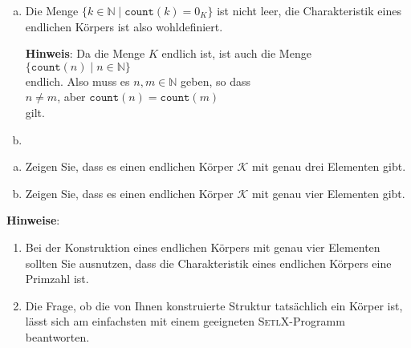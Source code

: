 \begin{enumerate}[(a)]
\item Die Menge $\bigl\{ k \in \mathbb{N} \mid \mathtt{count}(k) = 0_K \bigr \}$
      ist nicht leer, die Charakteristik eines endlichen K\"{o}rpers ist also wohldefiniert.

      \noindent
      \textbf{Hinweis}:
      Da die Menge $K$ endlich ist, ist auch die Menge
      \\[0.2cm]
      \hspace*{1.3cm}
      $\{ \mathtt{count}(n) \mid n \in \mathbb{N} \}$
      \\[0.2cm]
      endlich.  Also muss es $n, m \in \mathbb{N}$ geben, so dass
      \\[0.2cm]
      \hspace*{1.3cm}
      $n \not= m$, \quad aber \quad $\mathtt{count}(n) = \mathtt{count}(m)$
      \\[0.2cm]
      gilt.
\item \colorbox{red}{} \eoxs
\end{enumerate}

\exerciseStar
\begin{enumerate}[(a)]
\item Zeigen Sie, dass es einen endlichen K\"{o}rper $\mathcal{K}$ mit genau drei Elementen gibt.
\item Zeigen Sie, dass es einen endlichen K\"{o}rper $\mathcal{K}$ mit genau vier Elementen gibt. 
\end{enumerate}
\textbf{Hinweise}:
\begin{enumerate}
\item Bei der Konstruktion eines endlichen K\"{o}rpers mit genau vier Elementen sollten Sie ausnutzen,
      dass die Charakteristik eines endlichen K\"{o}rpers eine Primzahl ist.
\item Die Frage, ob die von Ihnen konstruierte Struktur tats\"{a}chlich ein K\"{o}rper ist, l\"{a}sst sich am
      einfachsten mit einem geeigneten \textsc{SetlX}-Programm beantworten.
      \eoxs
\end{enumerate}



